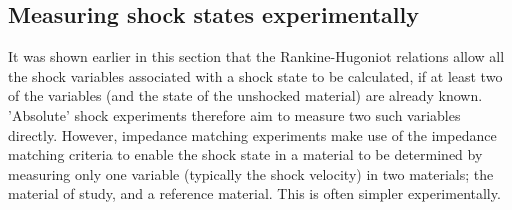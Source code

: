 \subsection{Measuring shock states experimentally \label{IMTheoryMeasurements}}





It was shown earlier in this section that the Rankine-Hugoniot relations allow all the shock variables associated with a shock state to be calculated, if at least two of the variables (and the state of the unshocked material) are already known. 'Absolute' shock experiments therefore aim to measure two such variables directly. However, impedance matching experiments make use of the impedance matching criteria to enable the shock state in a material to be determined by measuring only one variable (typically the shock velocity) in two materials; the material of study, and a reference material. This is often simpler experimentally.

